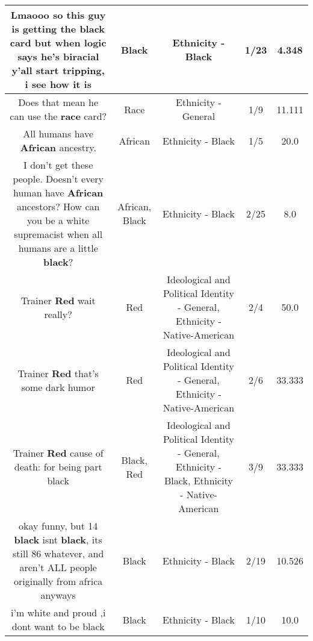 \documentclass[11pt]{article}
\newlength\mylength
\begin{document}
\begin{center}
\begin{longtable}{|C{.65\mylength}|C{.30\mylength}|C{.12\mylength}|C{.12\mylength}|C{.12\mylength}|}
  \small Lmaooo so this guy is getting the \textbf{black} card but when logic says he's biracial y'all start tripping, i see how it is\normalsize   & Black & Ethnicity - Black & 1/23 & 4.348 \\  \hline
  \small Does that mean he can use the \textbf{race} card?\normalsize   & Race & Ethnicity - General & 1/9 & 11.111 \\  \hline
  \small All humans have \textbf{African} ancestry.\normalsize   & African & Ethnicity - Black & 1/5 & 20.0 \\  \hline
  \small I don't get these people. Doesn't every human have \textbf{African} ancestors? How can you be a white supremacist when all humans are a little \textbf{black}?\normalsize   & African, Black & Ethnicity - Black & 2/25 & 8.0 \\  \hline
  \small Trainer \textbf{R\textbf{ed}} wait really?\normalsize   & Red &  Ideological and Political Identity - General, Ethnicity - Native-American & 2/4 & 50.0 \\  \hline
  \small Trainer \textbf{R\textbf{ed}} that's some dark humor\normalsize   & Red &  Ideological and Political Identity - General, Ethnicity - Native-American & 2/6 & 33.333 \\  \hline
  \small Trainer \textbf{R\textbf{ed}} cause of death: for being part black\normalsize   & Black, Red &  Ideological and Political Identity - General, Ethnicity - Black, Ethnicity - Native-American & 3/9 & 33.333 \\  \hline
  \small okay funny, but 14 \textbf{black} isnt \textbf{black}, its still 86 whatever, and aren't ALL people originally from africa anyways\normalsize   & Black & Ethnicity - Black & 2/19 & 10.526 \\  \hline
  \small i'm white and proud ,i dont want to be black\normalsize   & Black & Ethnicity - Black & 1/10 & 10.0 \\  \hline

\end{longtable}
\end{center}
\end{document}
